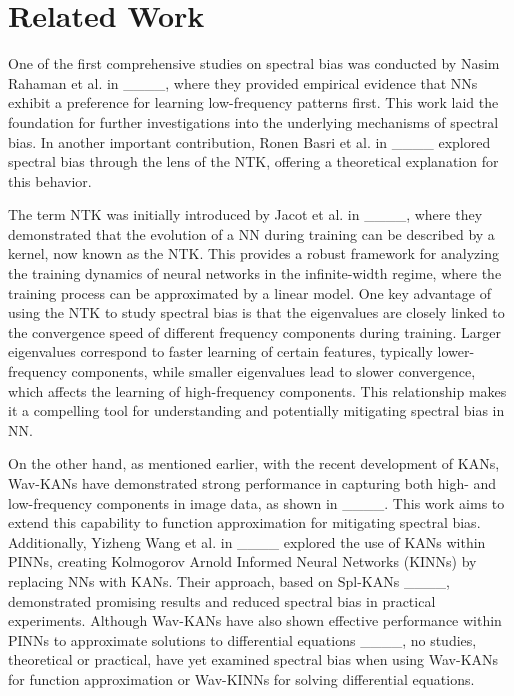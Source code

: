 \section{Related Work}
One of the first comprehensive studies on spectral bias was conducted by Nasim Rahaman et al. in ____, where they provided empirical evidence that NNs exhibit a preference for learning low-frequency patterns first. This work laid the foundation for further investigations into the underlying mechanisms of spectral bias. In another important contribution, Ronen Basri et al. in ____ explored spectral bias through the lens of the NTK, offering a theoretical explanation for this behavior. 

The term NTK was initially introduced by Jacot et al. in ____, where they demonstrated that the evolution of a NN during training can be described by a kernel, now known as the NTK. This provides a robust framework for analyzing the training dynamics of neural networks in the infinite-width regime, where the training process can be approximated by a linear model. One key advantage of using the NTK to study spectral bias is that the eigenvalues are closely linked to the convergence speed of different frequency components during training. Larger eigenvalues correspond to faster learning of certain features, typically lower-frequency components, while smaller eigenvalues lead to slower convergence, which affects the learning of high-frequency components. This relationship makes it a compelling tool for understanding and potentially mitigating spectral bias in NN.


On the other hand, as mentioned earlier, with the recent development of KANs, Wav-KANs have demonstrated strong performance in capturing both high- and low-frequency components in image data, as shown in ____. This work aims to extend this capability to function approximation for mitigating spectral bias. Additionally, Yizheng Wang et al. in ____ explored the use of KANs within PINNs, creating Kolmogorov Arnold Informed Neural Networks (KINNs) by replacing NNs with KANs. Their approach, based on Spl-KANs ____, demonstrated promising results and reduced spectral bias in practical experiments. Although Wav-KANs have also shown effective performance within PINNs to approximate solutions to differential equations ____, no studies, theoretical or practical, have yet examined spectral bias when using Wav-KANs for function approximation or Wav-KINNs for solving differential equations.

